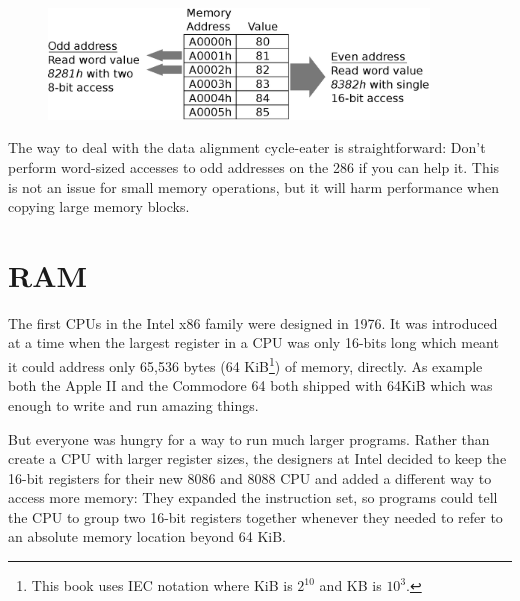 \documentclass[book.tex]{subfiles}
\begin{document}
\begin{figure}[H]
\centering
\includegraphics[width=0.9\textwidth]{imgs/drawings/data_alignment.eps}\\
\end{figure}
\par
 
\par
The way to deal with the data alignment cycle-eater is straightforward: Don't perform word-sized accesses to odd addresses on the 286 if you can help it. This is not an issue for small memory operations, but it will harm performance when copying large memory blocks. 



\section{RAM}
The first CPUs in the Intel x86 family were designed in 1976. It was introduced at a time when the largest register in a CPU was only 16-bits long which meant it could address only 65,536 bytes (64 KiB\footnote{This book uses IEC notation where KiB is $2^{10}$ and KB is $10^3$.}) of memory, directly. As example both  the Apple II and the Commodore 64 both shipped with 64KiB which was enough to write and run amazing things.\\

\par
But everyone was hungry for a way to run much larger programs. Rather than create a CPU with larger register sizes, the designers at Intel decided to keep the 16-bit registers for their new 8086 and 8088 CPU and added a different way to access more memory: They expanded the instruction set, so programs could tell the CPU to group  two 16-bit registers together whenever they needed to refer to an absolute memory location beyond 64 KiB.\\
\end{document}
